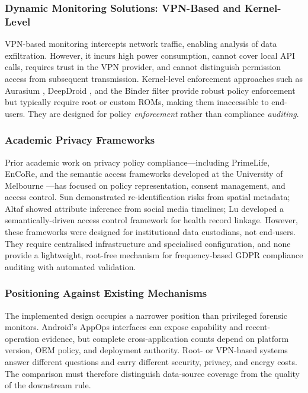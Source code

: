 \subsubsection{Dynamic Monitoring Solutions: VPN-Based and Kernel-Level}

VPN-based monitoring intercepts network traffic, enabling analysis of data exfiltration. However, it incurs high power consumption, cannot cover local API calls, requires trust in the VPN provider, and cannot distinguish permission access from subsequent transmission. Kernel-level enforcement approaches such as Aurasium \cite{42}, DeepDroid \cite{44}, and the Binder filter \cite{45} provide robust policy enforcement but typically require root or custom ROMs, making them inaccessible to end-users. They are designed for policy \emph{enforcement} rather than compliance \emph{auditing}.

\subsubsection{Academic Privacy Frameworks}

Prior academic work on privacy policy compliance—including PrimeLife, EnCoRe, and the semantic access frameworks developed at the University of Melbourne \cite{15,16,17}—has focused on policy representation, consent management, and access control. Sun \cite{15} demonstrated re-identification risks from spatial metadata; Altaf \cite{16} showed attribute inference from social media timelines; Lu \cite{17} developed a semantically-driven access control framework for health record linkage. However, these frameworks were designed for institutional data custodians, not end-users. They require centralised infrastructure and specialised configuration, and none provide a lightweight, root-free mechanism for frequency-based GDPR compliance auditing with automated validation.

\subsubsection{Positioning Against Existing Mechanisms}

The implemented design occupies a narrower position than privileged forensic monitors. Android's AppOps interfaces can expose capability and recent-operation evidence, but complete cross-application counts depend on platform version, OEM policy, and deployment authority. Root- or VPN-based systems answer different questions and carry different security, privacy, and energy costs. The comparison must therefore distinguish data-source coverage from the quality of the downstream rule.

